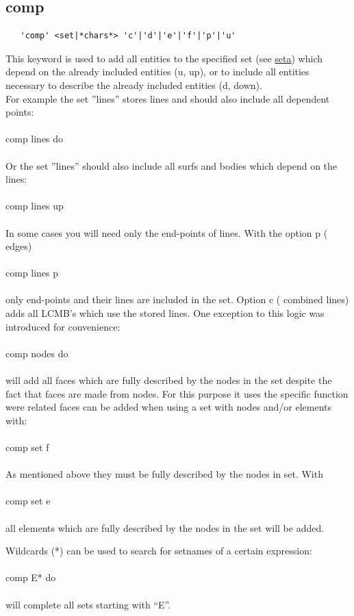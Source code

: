 \documentclass{article}
\providecommand{\htmlref}[2]{\hyperref[#2]{#1}}
\begin{document}
\subsection{\label{comp}comp}
\begin{verbatim}
   'comp' <set|*chars*> 'c'|'d'|'e'|'f'|'p'|'u'
\end{verbatim}
This keyword is used to add all entities to the specified set (see
\htmlref{seta}{seta}) which depend on the already included entities (u, up),
or to include all entities necessary to describe the already included entities
(d, down).\\For example the set ''lines'' stores lines and should also include
all dependent points:\\\\comp lines do\\\\Or the set ''lines'' should also
include all surfs and bodies which depend on the lines:\\\\comp lines up\\\\In
some cases you will need only the end-points of lines. With the option p (
edges)\\\\comp lines p\\\\only end-points and their lines are included in the set. Option c (
combined lines) adds all LCMB's which use the stored lines. One exception to this logic was introduced for convenience:\\\\comp nodes do\\\\will add all faces which are fully described by the nodes in the set despite the fact that faces are made from nodes. For this purpose it uses the specific function were related faces can be added when using a set with nodes and/or elements with:\\\\comp set f\\\\As mentioned above they must be fully described by the nodes in set. With\\\\comp set e\\\\all elements which are fully described by the nodes in the set will be added.

Wildcards (*) can be used to search for setnames of a certain expression:\\\\comp E* do\\\\will complete all sets starting with ``E''.
\end{document}
